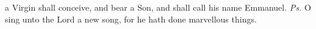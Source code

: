 %
%


%
  
  

\introit
{} a Virgin shall conceive, and bear a Son, and shall call his name Emmanuel. \textit{Ps.} O sing unto the Lord a new song, for he hath done marvellous things.

